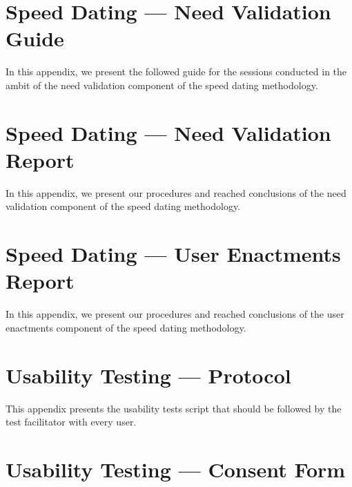 \chapter{Speed Dating — Need Validation Guide}
\label{chapter:appendixF}

In this appendix, we present the followed guide for the sessions conducted in the ambit of the need validation component of the speed dating methodology.




\chapter{Speed Dating — Need Validation Report}
\label{chapter:appendixG}

In this appendix, we present our procedures and reached conclusions of the need validation component of the speed dating methodology.



\chapter{Speed Dating — User Enactments Report}
\label{chapter:appendixE}

In this appendix, we present our procedures and reached conclusions of the user enactments component of the speed dating methodology.



\chapter{Usability Testing — Protocol}
\label{chapter:appendixH}

This appendix presents the usability tests script that should be followed by the test facilitator with every user.



\chapter{Usability Testing — Consent Form}
\label{chapter:appendixI}

